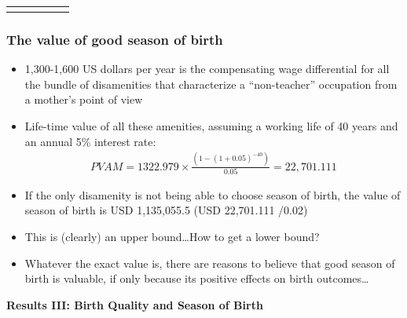 \documentclass[10pt,letterpaper,subeqn]{beamer}
\begin{document}
\begin{frame}
\begin{table}[htbp]
{\begin{tabular}{l*{4}{c}}
{\begin{footnotesize}
\end{footnotesize}}\end{tabular}}
\end{table}
\end{frame}



\begin{frame}
\frametitle{The value of good season of birth}
\begin{itemize}
\item 1,300-1,600 US dollars per year is the compensating wage differential for all the bundle of disamenities that characterize a ``non-teacher'' occupation from a mother's point of view
\item Life-time value of all these amenities, assuming a working life of 40 years and an annual 5\% interest rate:
\begin{align}
PVAM = 1322.979 \times \frac{(1-(1+0.05)^{-40})}{0.05} = 22,701.111
\end{align}
\item If the only disamenity is not being able to choose season of birth, the value of season of birth is USD 1,135,055.5 (USD 22,701.111 /0.02)
\item This is (clearly) an upper bound\ldots How to get a lower bound?
\item Whatever the exact value is, there are reasons to believe that good season of birth is valuable, if only because its positive effects on birth outcomes\ldots
\end{itemize}
\end{frame}

 
\begin{frame}
  \begin{center}
    \textbf{Results III: Birth Quality and Season of Birth}
  \end{center}
\end{frame}
\end{document}
